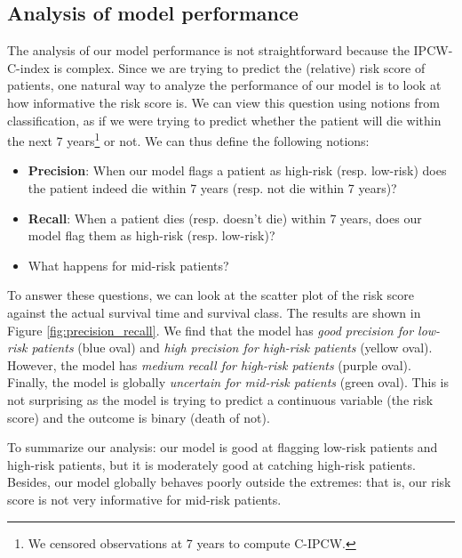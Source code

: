 \documentclass{article}
\begin{document}
\subsection{Analysis of model performance}

The analysis of our model performance is not straightforward because the IPCW-C-index is complex. Since we are trying to predict the (relative) risk score of patients, one natural way to analyze the performance of our model is to look at how informative the risk score is. We can view this question using notions from classification, as if we were trying to predict whether the patient will die within the next 7 years\footnote{We censored observations at 7 years to compute C-IPCW.} or not. We can thus define the following notions:
\begin{itemize}
    \item \textbf{Precision}: When our model flags a patient as high-risk (resp. low-risk) does the patient indeed die within 7 years (resp. not die within 7 years)?
    \item \textbf{Recall}: When a patient dies (resp. doesn't die) within 7 years, does our model flag them as high-risk (resp. low-risk)?
    \item What happens for mid-risk patients?
\end{itemize}

To answer these questions, we can look at the scatter plot of the risk score against the actual survival time and survival class. The results are shown in Figure \ref{fig:precision_recall}. We find that the model has \textit{good precision for low-risk patients} (blue oval) and \textit{high precision for high-risk patients} (yellow oval). However, the model has \textit{medium recall for high-risk patients} (purple oval). Finally, the model is globally \textit{uncertain for mid-risk patients} (green oval). This is not surprising as the model is trying to predict a continuous variable (the risk score) and the outcome is binary (death of not).

To summarize our analysis: our model is good at flagging low-risk patients and high-risk patients, but it is moderately good at catching high-risk patients. Besides, our model globally behaves poorly outside the extremes: that is, our risk score is not very informative for mid-risk patients.
\end{document}
